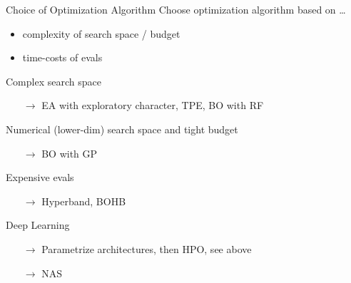 \begin{frame}{Choice of Optimization Algorithm}
  Choose optimization algorithm based on \ldots
  \begin{itemize}
    \item complexity of search space / budget
    \item time-costs of evals
  \end{itemize}

  \vspace{0.5em}

  Complex search space
  \begin{itemize}
    \item[$\rightarrow$] EA with exploratory character, TPE, BO with RF 
  \end{itemize}
  Numerical (lower-dim) search space and tight budget
  \begin{itemize}
    \item[$\rightarrow$] BO with GP
  \end{itemize}
  Expensive evals
  \begin{itemize}
    \item[$\rightarrow$] Hyperband, BOHB
  \end{itemize}
  Deep Learning 
  \begin{itemize}
    \item[$\rightarrow$]Parametrize architectures, then HPO, see above
    \item[$\rightarrow$]NAS 
  \end{itemize}

\end{frame}



